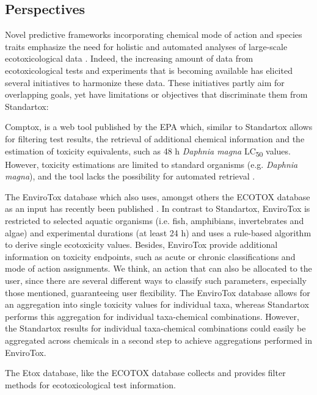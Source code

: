 \documentclass[journal,datadescriptor,accept,moreauthors,pdftex]{Definitions/mdpi}
\begin{document}
\subsection{Perspectives}
Novel predictive frameworks incorporating chemical mode of action and species traits emphasize the need for holistic and automated analyses of large-scale ecotoxicological data \citep{malaj_evolutionary_2016, vandenberg_modeling_2019}. Indeed, the increasing amount of data from ecotoxicological tests and experiments that is becoming available has elicited several initiatives to harmonize these data. These initiatives partly aim for overlapping goals, yet have limitations or objectives that discriminate them from Standartox:

Comptox, is a web tool published by the EPA which, similar to Standartox allows for filtering test results, the retrieval of additional chemical information and the estimation of toxicity equivalents, such as 48 h \textit{Daphnia magna} LC\textsubscript{50} values. However, toxicity estimations are limited to standard organisms (e.g. \textit{Daphnia magna}), and the tool lacks the possibility for automated retrieval \citep{williams_comptox_2017}.

The EnviroTox database which also uses, amongst others the ECOTOX database as an input has recently been published \citep{healthandenvironmentalsciencesinstitutehesi_envirotox_2019, connors_creation_2019}. In contrast to Standartox, EnviroTox  is restricted to selected aquatic organisms (i.e. fish, amphibians, invertebrates and algae) and experimental durations (at least 24 h) and uses a rule-based algorithm to derive single ecotoxicity values. Besides, EnviroTox provide additional information on toxicity endpoints, such as acute or chronic classifications and mode of action assignments. We think, an action that can also be allocated to the user, since there are several different ways to classify such parameters, especially those mentioned, guaranteeing user flexibility. The EnviroTox database allows for an aggregation into single toxicity values for individual taxa, whereas Standartox performs this aggregation for individual taxa-chemical combinations. However, the Standartox results for individual taxa-chemical combinations could easily be aggregated across chemicals in a second step to achieve aggregations performed in EnviroTox.

The Etox database, like the ECOTOX database collects and provides filter methods for ecotoxicological test information.
\end{document}
